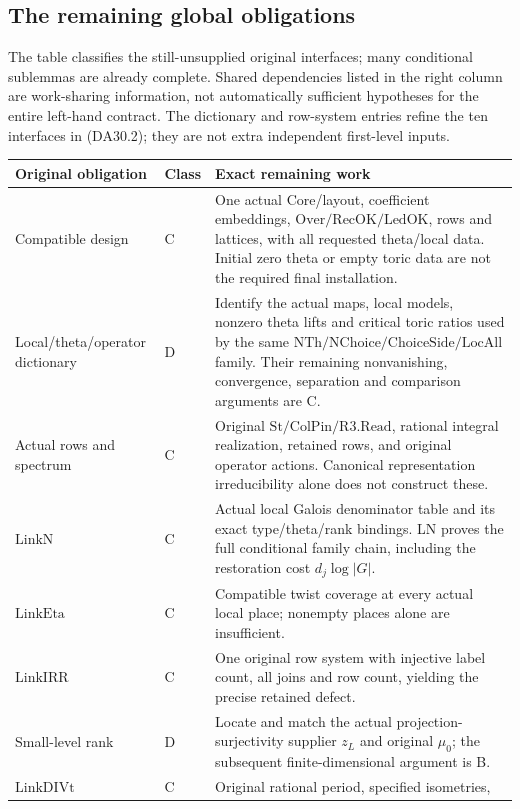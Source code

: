 \subsection{The remaining global obligations}

The table classifies the still-unsupplied original interfaces; many
conditional sublemmas are already complete.  Shared dependencies listed
in the right column are work-sharing information, not automatically
sufficient hypotheses for the entire left-hand contract.
The dictionary and row-system entries refine the ten interfaces in
(DA30.2); they are not extra independent first-level inputs.

\begin{center}
\begin{longtable}{p{.22\linewidth}p{.08\linewidth}p{.59\linewidth}}
Original obligation&Class&Exact remaining work\\\hline
Compatible design&C&One actual Core/layout, coefficient embeddings,
$\mathrm{Over/RecOK/LedOK}$, rows and lattices, with all requested
theta/local data.  Initial zero theta or empty toric data are not the
required final installation.\\
Local/theta/operator dictionary&D&Identify the actual maps, local models,
nonzero theta lifts and critical toric ratios used by the same
$\mathrm{NTh/NChoice/ChoiceSide/LocAll}$ family.  Their remaining
nonvanishing, convergence, separation and comparison arguments are C.\\
Actual rows and spectrum&C&Original $\mathrm{St/ColPin/R3.Read}$,
rational integral realization, retained rows, and original operator
actions.  Canonical representation irreducibility alone does not
construct these.\\
$\mathrm{LinkN}$&C&Actual local Galois denominator table and its exact
type/theta/rank bindings.  LN proves the full conditional family chain,
including the restoration cost $d_j\log|G|$.\\
$\mathrm{LinkEta}$&C&Compatible twist coverage at every actual local
place; nonempty places alone are insufficient.\\
$\mathrm{LinkIRR}$&C&One original row system with injective label count,
all joins and row count, yielding the precise retained defect.\\
Small-level rank&D&Locate and match the actual projection-surjectivity
supplier $z_L$ and original $\mu_0$; the subsequent finite-dimensional
argument is B.\\
$\mathrm{LinkDIVt}$&C&Original rational period, specified isometries,

\end{longtable}
\end{center}
